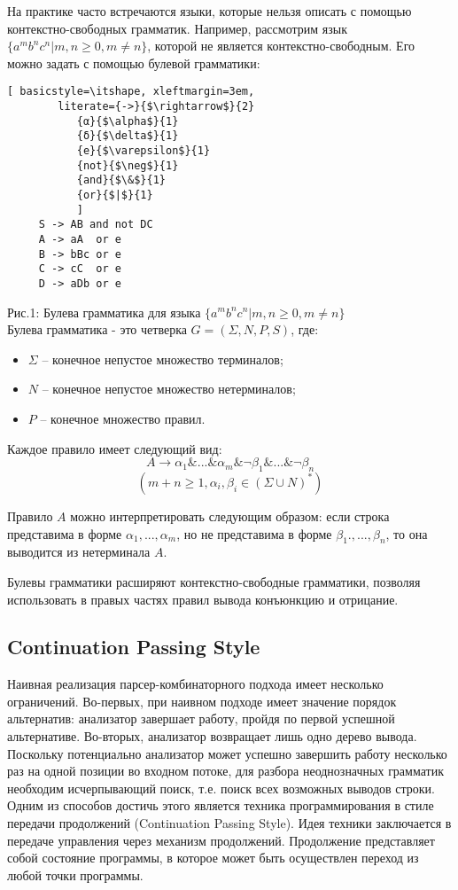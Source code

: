 \documentclass[14pt]{matmex-diploma}
\begin{document}
На практике часто встречаются языки,  которые нельзя описать с помощью контекстно-свободных грамматик.
Например, рассмотрим язык $\{a^{m}b^{n}c^{n} |m, n \geq 0, m \neq n\}$, которой не является контекстно-свободным. Его можно задать с помощью булевой грамматики:

\begin{lstlisting}[ basicstyle=\itshape, xleftmargin=3em,
        literate={->}{$\rightarrow$}{2}
           {α}{$\alpha$}{1}
           {δ}{$\delta$}{1}
           {e}{$\varepsilon$}{1}
           {not}{$\neg$}{1}
           {and}{$\&$}{1}
           {or}{$|$}{1}
           ]
     S -> AB and not DC 
     A -> aA  or e
     B -> bBc or e  
     C -> cC  or e  
     D -> aDb or e 
\end{lstlisting}
 Рис.1: Булева грамматика для языка $\{a^{m}b^{n}c^{n} |m, n \geq 0, m \neq n\}$ \\
 
Булева грамматика - это четверка $G = (\Sigma, N, P, S)$, где:
    \begin{itemize}
        \item $\Sigma$ -- конечное непустое множество терминалов;
        \item $N$ -- конечное непустое множество нетерминалов;
        \item $P$ -- конечное множество правил.
    \end{itemize}

Каждое правило имеет следующий вид:
    \[A \rightarrow \alpha_1 \&...\&\alpha_m\&\neg \beta_1 \&...\&\neg \beta_n \]
    \[(m + n \geq 1, \alpha_i, \beta_i \in (\Sigma \cup N)^{*}) \]
    
Правило $A$ можно интерпретировать следующим образом: если строка представима в форме $\alpha_1 ,...,\alpha_m$, но не представима в форме $\beta_1 .,...,\beta_n$, то она выводится из нетерминала $A$.

Булевы грамматики расширяют контекстно-свободные грамматики, позволяя использовать в правых частях правил вывода конъюнкцию и отрицание.

    \subsection{Continuation Passing Style}
    Наивная реализация парсер-комбинаторного подхода имеет несколько ограничений. Во-первых, при наивном подходе имеет значение порядок альтернатив: анализатор завершает работу, пройдя по первой успешной альтернативе. Во-вторых, анализатор возвращает лишь одно дерево вывода. Поскольку потенциально анализатор может успешно завершить работу несколько раз на одной позиции во входном потоке, для разбора неоднозначных грамматик необходим исчерпывающий поиск, т.е. поиск всех возможных выводов строки. Одним из способов достичь этого является техника программирования в стиле передачи продолжений (Continuation Passing Style). Идея техники заключается в передаче управления через механизм продолжений. Продолжение представляет собой состояние программы, в которое может быть осуществлен переход из любой точки программы.
    
\end{document}
